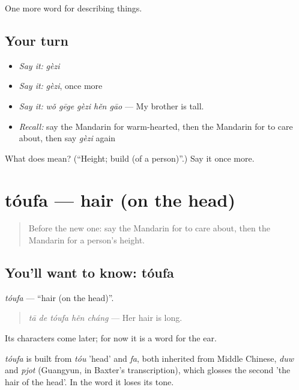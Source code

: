 \begin{grammarlens}[title={What you've built}]
One more word for describing things.
\end{grammarlens}

\subsection*{Your turn}
\begin{itemize}
\raggedright
  \item \emph{Say it:} \emph{gèzi}
  \item \emph{Say it:} \emph{gèzi}, once more
  \item \emph{Say it:} \emph{wǒ gēge gèzi hěn gāo} — My brother is tall.
  \item \emph{Recall:} say the Mandarin for warm-hearted, then the Mandarin for to care about, then say \emph{gèzi} again
\end{itemize}

\begin{tcolorbox}[breakable,colback=teal!4,colframe=teal!35!black,title={Before you move on}]
What does  mean? (\textquotedblleft{}Height; build (of a person)\textquotedblright{}.) Say it once more.
\end{tcolorbox}
\section[tóufa]{tóufa — hair (on the head)}

\label{lesson:ZH-C124-toufa}



\begin{quote}
Before the new one: say the Mandarin for to care about, then the Mandarin for a person's height.
\end{quote}

\subsection*{You'll want to know: tóufa}
\emph{tóufa} — \textquotedblleft{}hair (on the head)\textquotedblright{}.

\begin{quote}
\emph{tā de tóufa hěn cháng} — Her hair is long.
\end{quote}

Its characters come later; for now it is a word for the ear.

\begin{cousinweb}
\emph{tóufa} is built from \emph{tóu} 'head' and \emph{fa}, both inherited from Middle Chinese, \emph{duw} and \emph{pjot} (Guangyun, in Baxter's transcription), which glosses the second 'the hair of the head'. In the word it loses its tone.
\end{cousinweb}


